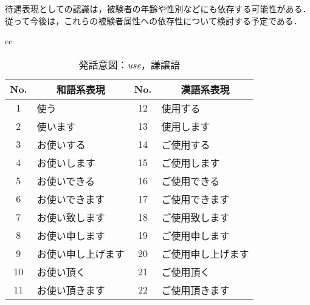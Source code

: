 待遇表現としての認識は，被験者の年齢や性別などにも依存する可能性がある．従って今後は，これらの被験者属性への依存性について検討する予定である．



\newpage




\def\appndnum{}
\setcounter{appndnum}{1}

\renewcommand{\figurename}{}
\renewcommand{\tablename}{}

\makeatletter
 \renewcommand{\thetable}{}
 \makeatother


\makeatletter
 \renewcommand{\thefigure}{}
 \makeatother

\begin{table}[htbp]
\begin{center}
{ \scriptsize
\begin{tabular}{cc}
\begin{minipage}[t]{0.5\hsize}
\begin{center}


\caption{発話意図：{\it use}，謙譲語}
\label{tbl2:table1.1} 
\begin{tabular}{|c||l|c||l|} 
\hline 
No. & \multicolumn{1}{|c|}{和語系表現} & No. & \multicolumn{1}{|c|}{漢語系表現} \\
\hline 
1&	使う&			12&	使用する \\
\hline 
2&	使います&		13&	使用します \\
\hline 
3&	お使いする&		14&	ご使用する \\
\hline 
4&	お使いします&		15&	ご使用します \\
\hline 
5&	お使いできる&		16&	ご使用できる \\
\hline 
6&	お使いできます&		17&	ご使用できます \\
\hline 
7&	お使い致します&		18&	ご使用致します \\
\hline 
8&	お使い申します&		19&	ご使用申します \\
\hline 
9&	お使い申し上げます&	20&	ご使用申し上げます \\
\hline 
10&	お使い頂く&		21&	ご使用頂く \\
\hline 
11&	お使い頂きます&		22&	ご使用頂きます \\
\hline
\end{tabular} 

\end{center}
\end{minipage}
\begin{minipage}[t]{0.5\hsize}
\begin{center}




\end{center}
\end{minipage}
\end{tabular}}
\end{center}
\end{table}

